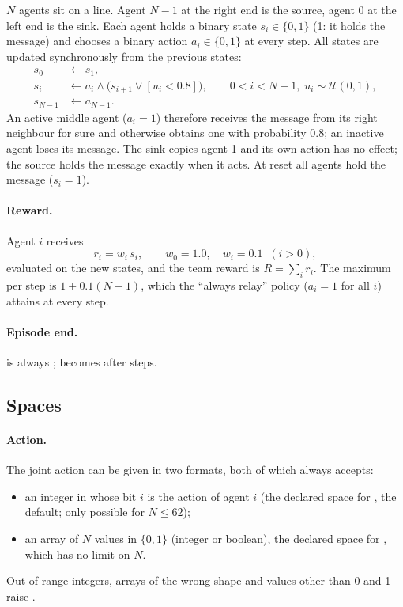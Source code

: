 $N$ agents sit on a line. Agent $N-1$ at the right end is the source, agent 0
at the left end is the sink. Each agent holds a binary state $s_i \in \{0, 1\}$
(1: it holds the message) and chooses a binary action $a_i \in \{0, 1\}$ at
every step. All states are updated synchronously from the previous states:
\begin{align}
  s_0 &\leftarrow s_1, \nonumber\\
  s_i &\leftarrow a_i \wedge \bigl(s_{i+1} \vee [u_i < 0.8]\bigr),
       \qquad 0 < i < N-1,\; u_i \sim \mathcal{U}(0, 1), \label{eq:linemsg}\\
  s_{N-1} &\leftarrow a_{N-1}. \nonumber
\end{align}
An active middle agent ($a_i = 1$) therefore receives the message from its
right neighbour for sure and otherwise obtains one with probability 0.8; an
inactive agent loses its message. The sink copies agent 1 and its own action
has no effect; the source holds the message exactly when it acts. At reset all
agents hold the message ($s_i = 1$).

\paragraph{Reward.} Agent $i$ receives
\begin{equation}
  r_i = w_i\, s_i, \qquad w_0 = 1.0, \quad w_i = 0.1 \;\; (i > 0),
\end{equation}
evaluated on the new states, and the team reward is $R = \sum_i r_i$. The
maximum per step is $1 + 0.1(N - 1)$, which the ``always relay'' policy
($a_i = 1$ for all $i$) attains at every step.

\paragraph{Episode end.}  is always ;
 becomes  after  steps.

\subsection{Spaces}\label{sec:linemsg-spaces}

\paragraph{Action.} The joint action can be given in two formats, both of
which  always accepts:
\begin{itemize}
  \item an integer in  whose bit $i$ is the action of
        agent $i$ (the declared space for ,
        the default; only possible for $N \le 62$);
  \item an array of $N$ values in $\{0, 1\}$ (integer or boolean), the
        declared space  for
        , which has no limit on $N$.
\end{itemize}
Out-of-range integers, arrays of the wrong shape and values other than 0 and 1
raise .

